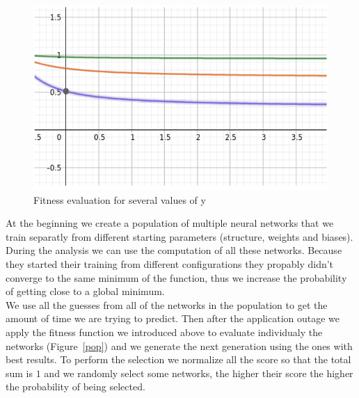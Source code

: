 \documentclass[10pt,a4paper,oneside]{article}
\begin{document}
\vspace{0.8cm}

\begin{figure}[!ht]
\centering
\includegraphics[scale=0.5]{./images/fitness.png}
\caption{Fitness evaluation for several values of y}
\label{fonction}
\end{figure}

\vspace{0.8cm}

\begin{multicols}{2}
At the beginning we create a population of multiple neural networks that we train separatly from different starting parameters (structure, weights and biases). During the analysis we can use the computation of all these networks. Because they started their training from different configurations they propably didn't converge to the same minimum of the function, thus we increase the probability of getting close to a global minimum. 
\\We use all the guesses from all of the networks in the population to get the amount of time we are trying to predict. Then after the application outage we apply the fitness function we introduced above to evaluate individualy the networks (Figure~\ref{pop}) and we generate the next generation using the ones with best results. To perform the selection we normalize all the score so that the total sum is $1$ and we randomly select some networks, the higher their score the higher the probability of being selected.
\end{multicols}

\vspace{0.8cm}
\end{document}
